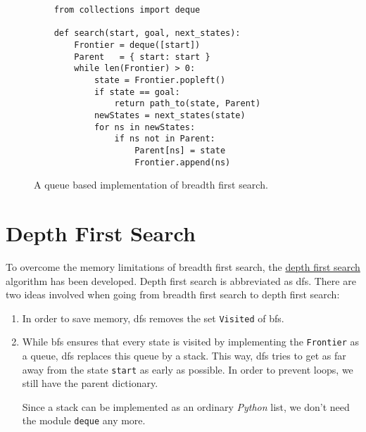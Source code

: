 \begin{figure}[!ht]
\centering
\begin{verbatim}
    from collections import deque

    def search(start, goal, next_states):
        Frontier = deque([start])
        Parent   = { start: start }
        while len(Frontier) > 0:
            state = Frontier.popleft()
            if state == goal:
                return path_to(state, Parent)
            newStates = next_states(state)
            for ns in newStates:
                if ns not in Parent:
                    Parent[ns] = state
                    Frontier.append(ns)
\end{verbatim}
\vspace*{-0.3cm}
\caption{A queue based implementation of breadth first search.}
\label{fig:Breadth-First-Search-Queue.ipynb}
\end{figure}
\FloatBarrier


\section{Depth First Search}
To overcome the memory limitations of breadth first search, the
\href{https://en.wikipedia.org/wiki/Depth-first_search}{depth first search} algorithm 
has been developed.  Depth first search is abbreviated as \ac{dfs}.  There are two ideas involved when going from
breadth first search to depth first search:
\begin{enumerate}
\item In order to save memory, \ac{dfs} removes the set \texttt{Visited} of \ac{bfs}.
\item While \ac{bfs} ensures that every state is visited by implementing the \texttt{Frontier} as a queue,
      \ac{dfs} replaces this queue by a stack.  This way, \ac{dfs} tries to get as far away from the state
      \texttt{start} as early as possible.  In order to prevent loops, we still have the parent dictionary.

      Since a stack can be implemented as an ordinary \textsl{Python} list, we don't need the module
      \texttt{deque} any more. 
\end{enumerate}

